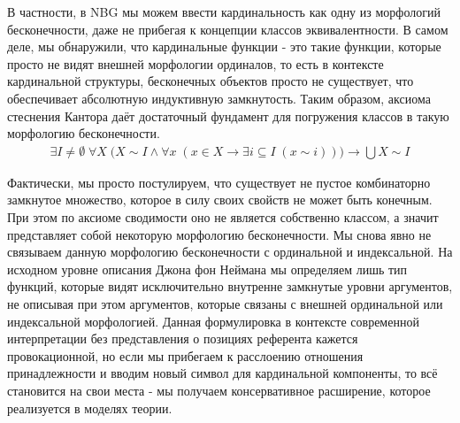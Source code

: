 \documentclass[12pt]{article}
\begin{document}
В частности, в NBG мы можем ввести кардинальность как одну из морфологий бесконечности, даже не прибегая к концепции классов эквивалентности. В самом деле, мы обнаружили, что кардинальные функции - это такие функции, которые просто не видят внешней морфологии ординалов, то есть в контексте кардинальной структуры, бесконечных объектов просто не существует, что обеспечивает абсолютную индуктивную замкнутость. Таким образом, аксиома стеснения Кантора даёт достаточный фундамент для погружения классов в такую морфологию бесконечности.
\begin{equation}
\begin{gathered}
\exists I \neq \emptyset \; \forall X \; \bigl(X \sim I \wedge \forall x \; (x \in X \to \exists i \subseteq I \; (x \sim i)) \bigr) \to \bigcup X \sim I
\label{axiom:cardinal-infinity}
\end{gathered}
\end{equation}

Фактически, мы просто постулируем, что существует не пустое комбинаторно замкнутое множество, которое в силу своих свойств не может быть конечным. При этом по аксиоме сводимости оно не является собственно классом, а значит представляет собой некоторую морфологию бесконечности. Мы снова явно не связываем данную морфологию бесконечности с ординальной и индексальной. На исходном уровне описания Джона фон Неймана мы определяем лишь тип функций, которые видят исключительно внутренне замкнутые уровни аргументов, не описывая при этом аргументов, которые связаны с внешней ординальной или индексальной морфологией. Данная формулировка в контексте современной интерпретации без представления о позициях референта кажется провокационной, но если мы прибегаем к расслоению отношения принадлежности и вводим новый символ для кардинальной компоненты, то всё становится на свои места - мы получаем консервативное расширение, которое реализуется в моделях теории. 
\end{document}
